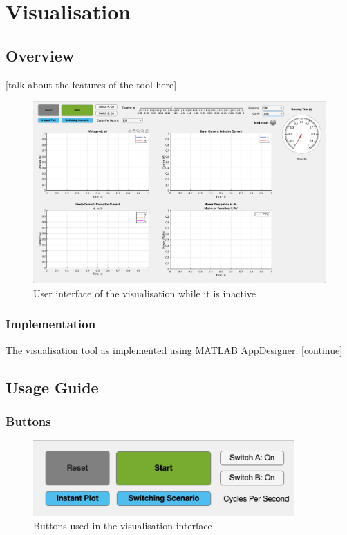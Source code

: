 \section{Visualisation}
\subsection{Overview} [talk about the features of the tool here]
\begin{figure}[H]
     \centering
     \includegraphics[width=\textwidth]{graphics/visualisation/inactive_ui}
     \caption{User interface of the visualisation while it is inactive}
\end{figure}

\subsubsection{Implementation}
The visualisation tool as implemented using MATLAB AppDesigner. [continue]

\pagebreak
\subsection{Usage Guide}
\subsubsection{Buttons}
\begin{figure}[H]
     \centering
     \includegraphics[width=10cm]{graphics/visualisation/ui_buttons}
     \caption{Buttons used in the visualisation interface}
\end{figure}

